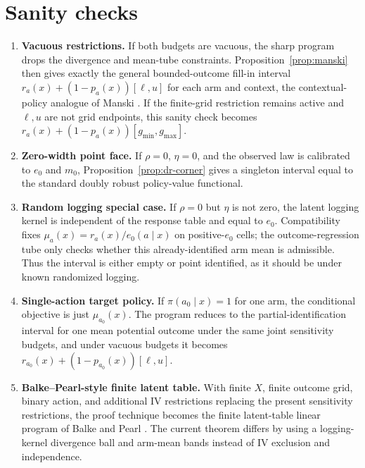 \documentclass[11pt]{article}
\theoremstyle{definition}
\theoremstyle{plain}
\theoremstyle{remark}
\begin{document}
\section{Sanity checks}
\begin{enumerate}[leftmargin=*]
\item \textbf{Vacuous restrictions.}  If both budgets are vacuous, the sharp
program drops the divergence and mean-tube constraints.  Proposition~\ref{prop:manski}
then gives exactly the general bounded-outcome fill-in interval
$r_a(x)+(1-p_a(x))[\ell,u]$ for each arm and context, the contextual-policy
analogue of Manski \cite{Manski1990}.  If the finite-grid restriction remains
active and $\ell,u$ are not grid endpoints, this sanity check becomes
$r_a(x)+(1-p_a(x))[g_{\min},g_{\max}]$.

\item \textbf{Zero-width point face.}  If $\rho=0$, $\eta=0$, and the observed
law is calibrated to $e_0$ and $m_0$, Proposition~\ref{prop:dr-corner} gives a
singleton interval equal to the standard doubly robust policy-value functional.

\item \textbf{Random logging special case.}  If $\rho=0$ but $\eta$ is not zero,
the latent logging kernel is independent of the response table and equal to
$e_0$.  Compatibility fixes $\mu_a(x)=r_a(x)/e_0(a\mid x)$ on positive-$e_0$
cells; the outcome-regression tube only checks whether this already-identified
arm mean is admissible.  Thus the interval is either empty or point identified,
as it should be under known randomized logging.

\item \textbf{Single-action target policy.}  If $\pi(a_0\mid x)=1$ for one arm,
the conditional objective is just $\mu_{a_0}(x)$.  The program reduces to the
partial-identification interval for one mean potential outcome under the same
joint sensitivity budgets, and under vacuous budgets it becomes
$r_{a_0}(x)+(1-p_{a_0}(x))[\ell,u]$.

\item \textbf{Balke--Pearl-style finite latent table.}  With finite $X$, finite
outcome grid, binary action, and additional IV restrictions replacing the
present sensitivity restrictions, the proof technique becomes the finite
latent-table linear program of Balke and Pearl \cite{BalkePearl1997}.  The
current theorem differs by using a logging-kernel divergence ball and
arm-mean bands instead of IV exclusion and independence.
\end{enumerate}
\end{document}
